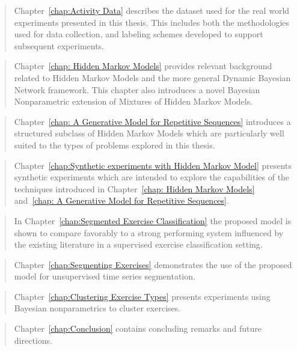 \documentclass[12pt]{report}
\newcommand{\1}[0]{\mathbbm{1}}
\begin{document}
\begin{quote}
    Chapter~\ref{chap:Activity Data} describes the dataset used
    for the real world experiments presented in this thesis.
    This includes both the methodologies used for data collection,
    and labeling schemes developed to support subsequent experiments.
\end{quote}

\begin{quote}
    Chapter~\ref{chap: Hidden Markov Models} provides relevant background
    related to Hidden Markov Models and the more general Dynamic Bayesian Network
    framework. This chapter also introduces a novel Bayesian Nonparametric extension
    of Mixtures of Hidden Markov Models.
\end{quote}

\begin{quote}
    Chapter~\ref{chap: A Generative Model for Repetitive Sequences} introduces
    a structured subclass of Hidden Markov Models which are particularly well suited
    to the types of problems explored in this thesis.
\end{quote}

\begin{quote}
    Chapter~\ref{chap:Synthetic experiments with Hidden Markov Model} presents
    synthetic experiments which are intended to explore the capabilities of the
    techniques introduced in Chapter~\ref{chap: Hidden Markov Models}
    and~\ref{chap: A Generative Model for Repetitive Sequences}.
\end{quote}

\begin{quote}
    In Chapter~\ref{chap:Segmented Exercise Classification} the proposed
    model is shown to compare favorably to a strong performing system influenced
    by the existing literature in a supervised exercise classification setting.
\end{quote}

\begin{quote}
    Chapter~\ref{chap:Segmenting Exercises} demonstrates the use of the proposed
    model for unsupervised time series segmentation.
\end{quote}

\begin{quote}
    Chapter~\ref{chap:Clustering Exercise Types} presents experiments
    using Bayesian nonparametrics to cluster exercises.
\end{quote}

\begin{quote}
    Chapter~\ref{chap:Conclusion} contains concluding remarks and future directions.
\end{quote}
\end{document}
